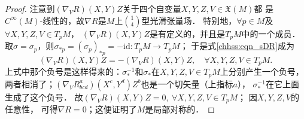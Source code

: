 \begin{proof}
注意到$(\nabla_V R)(X, Y) Z$关于四个自变量$X, Y, Z, V \in \mathfrak{X}(M)$都
是$C^{\infty}(M)$-线性的，故$\nabla R$是$M$上$\binom{1}{4}$型光滑张量场．
特别地，$\forall p \in M$及$\forall X, Y, Z, V \in T_p M$，
$(\nabla_V R)(X, Y) Z$是有定义的，并且是$T_p M$中的一个成员．
取$\sigma=\sigma_p$，则$\sigma_{*p}=(\sigma_{p})_{*p}=-\mathrm{id} : T_p M \rightarrow T_p M$；
于是式\eqref{chhss:eqn_sDR}成为
\begin{equation}
    (\nabla_V R)(X, Y) Z= -(\nabla_V R)(X, Y) Z, \quad \forall X, Y, Z, V \in T_p M.
\end{equation}
上式中那个负号是这样得来的：$\sigma_*^{-1}$和$\sigma_*$在$X, Y, Z, V \in T_p M$上分别产生一个负号，
两者相消了；$(\nabla_V R^a_{bcd})(X^c, Y^d) Z^b$也是一个切矢量（上指标$a$），
$\sigma_*^{-1}$在它上面生成了这个负号．
故$(\nabla_V R)(X, Y) Z=0,\ \forall X, Y, Z, V \in T_p M$；
因$X, Y, Z, V$的任意性，
可得$\nabla R=0$；这便证明了$M$是局部对称的．
\end{proof}

